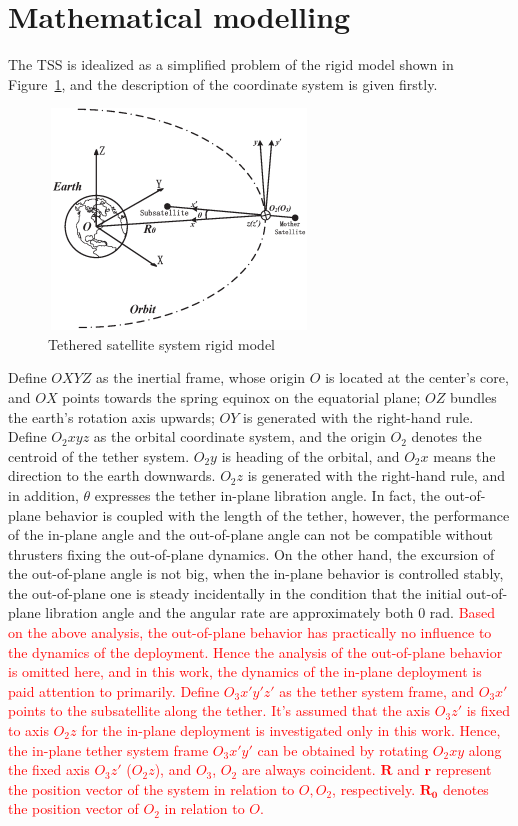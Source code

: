 \documentclass[3p]{elsarticle}
\theoremstyle{plain}
\begin{document}
\section{Mathematical modelling}\label{sec:mm}
The TSS is idealized as a simplified problem of the rigid model shown in Figure~\ref{fig:model}, and the description of the coordinate system is given firstly.
\begin{figure}
\centering
\includegraphics[width=6.94cm,height=5.87cm]{orbit_in_plane.eps}
\caption{Tethered satellite system rigid model}\label{fig:model}
\end{figure}
Define $OXYZ$ as the inertial frame, whose origin $O$ is located at the center's core, and $OX$ points towards the spring equinox on the equatorial plane; $OZ$ bundles the earth's rotation axis upwards; $OY$ is generated with the right-hand rule.
Define $O_2xyz$ as the orbital coordinate system, and the origin $O_2$ denotes the centroid of the tether system. $O_2y$ is heading of the orbital, and $O_2x$ means the direction to the earth downwards. $O_2z$ is generated with the right-hand rule, and in addition, $\theta$ expresses the tether in-plane libration angle. In fact, the out-of-plane behavior is coupled with the length of the tether, however, the performance of the in-plane angle and the  out-of-plane angle can not be compatible without thrusters fixing the out-of-plane dynamics\cite{Vadali1991Feedback}. On the other hand, the excursion of the out-of-plane angle is not big, when the in-plane behavior is controlled stably, the out-of-plane one is steady incidentally in the condition that the initial out-of-plane libration angle and the angular rate are approximately both $0$ rad. \textcolor{red}{Based on the above analysis, the out-of-plane behavior has practically no influence to the dynamics of the deployment. Hence the analysis of the out-of-plane behavior is omitted here, and in this work, the dynamics of the in-plane deployment is paid attention to primarily. Define $O_3x'y'z'$ as the tether system frame, and $O_3x'$ points to the subsatellite along the tether. It's assumed that the axis $O_3z'$ is fixed to axis $O_2z$ for the in-plane deployment is investigated only in this work. Hence, the in-plane tether system frame $O_3x'y'$ can be obtained by rotating $O_2xy$ along the fixed axis $O_3z'$ ($O_2z$), and $O_3$, $O_2$ are always coincident. $\bm{R}$ and $\bm{r}$ represent the position vector of the system in relation to $O,O_2$, respectively. $\bm{R_0}$ denotes the position vector of $O_2$ in relation to $O$.}\par
\end{document}
